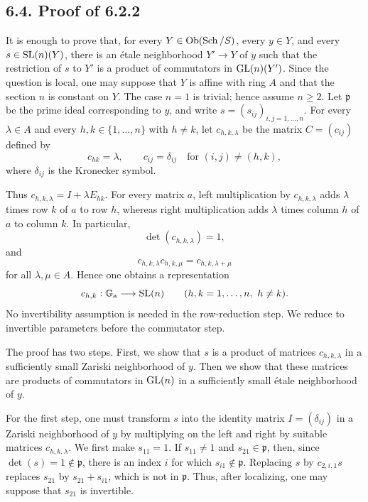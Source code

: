 \subsection*{6.4. Proof of 6.2.2}
It is enough to prove that, for every $Y\in\operatorname{Ob}(\operatorname{Sch}/S)$, every $y\in Y$,
and every $s\in\operatorname{SL}(n)(Y)$, there is an \'etale neighborhood $Y'\to Y$ of
$y$ such that the restriction of $s$ to $Y'$ is a product of commutators
in $\operatorname{GL}(n)(Y')$. Since the question is local, one may suppose that $Y$ is
affine with ring $A$ and that the section $n$ is constant on $Y$. The case
$n=1$ is trivial; hence assume $n\geq2$. Let
$\mathfrak p$ be the prime ideal corresponding to $y$, and write
$s=(s_{ij})_{i,j=1,\ldots,n}$. For every $\lambda\in A$ and every
$h,k\in\{1,\ldots,n\}$ with $h\ne k$, let $c_{h,k,\lambda}$ be the matrix
$C=(c_{ij})$ defined by
\[
c_{hk}=\lambda,\qquad
c_{ij}=\delta_{ij}\quad\text{for }(i,j)\ne(h,k),
\]
where $\delta_{ij}$ is the Kronecker symbol.

Thus $c_{h,k,\lambda}=I+\lambda E_{hk}$. For every matrix $a$, left
multiplication by $c_{h,k,\lambda}$ adds $\lambda$ times row $k$ of $a$ to
row $h$, whereas right multiplication adds $\lambda$ times column $h$ of
$a$ to column $k$. In particular,
\[
\det(c_{h,k,\lambda})=1,
\]
and
\begin{equation}\tag{6.4.1}
c_{h,k,\lambda}c_{h,k,\mu}=c_{h,k,\lambda+\mu}
\end{equation}
for all $\lambda,\mu\in A$. Hence one obtains a representation
\[
c_{h,k}:\mathbb G_{\mathrm a}\longrightarrow\operatorname{SL}(n)
\qquad(h,k=1,\ldots,n,\ h\ne k).
\]
No invertibility assumption is needed in the row-reduction step. We reduce
to invertible parameters before the commutator step.

The proof has two steps. First, we show that $s$ is a product of matrices
$c_{h,k,\lambda}$ in a sufficiently small Zariski neighborhood of $y$.
Then we show that these matrices are products of commutators in $\operatorname{GL}(n)$ in
a sufficiently small \'etale neighborhood of $y$.

For the first step, one must transform $s$ into the identity matrix
$I=(\delta_{ij})$ in a Zariski neighborhood of $y$ by multiplying on the
left and right by suitable matrices $c_{h,k,\lambda}$. We first make
$s_{11}=1$. If $s_{11}\ne1$ and $s_{21}\in\mathfrak p$, then, since
$\det(s)=1\notin\mathfrak p$, there is an index $i$ for which
$s_{i1}\notin\mathfrak p$. Replacing $s$ by $c_{2,i,1}s$ replaces
$s_{21}$ by $s_{21}+s_{i1}$, which is not in $\mathfrak p$. Thus, after
localizing, one may suppose that $s_{21}$ is invertible.

